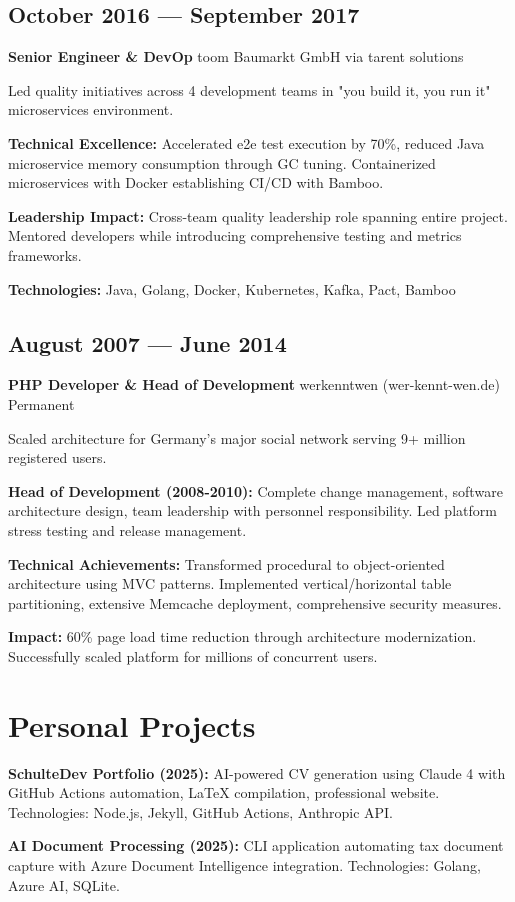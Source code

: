 \documentclass[10pt,a4paper]{article}
\newcommand{\role}[4]{\subsection{#1}\textbf{#2} \textbar{} #3 \textbar{} #4\vspace{2pt}}
\begin{document}
\role{October 2016 — September 2017}{Senior Engineer \& DevOp}{toom Baumarkt GmbH}{via tarent solutions}

Led quality initiatives across 4 development teams in "you build it, you run it" microservices environment.

\textbf{Technical Excellence:} Accelerated e2e test execution by 70\%, reduced Java microservice memory consumption through GC tuning. Containerized microservices with Docker establishing CI/CD with Bamboo.

\textbf{Leadership Impact:} Cross-team quality leadership role spanning entire project. Mentored developers while introducing comprehensive testing and metrics frameworks.

\textbf{Technologies:} Java, Golang, Docker, Kubernetes, Kafka, Pact, Bamboo

\vspace{4pt}

\role{August 2007 — June 2014}{PHP Developer \& Head of Development}{werkenntwen (wer-kennt-wen.de)}{Permanent}

Scaled architecture for Germany's major social network serving 9+ million registered users.

\textbf{Head of Development (2008-2010):} Complete change management, software architecture design, team leadership with personnel responsibility. Led platform stress testing and release management.

\textbf{Technical Achievements:} Transformed procedural to object-oriented architecture using MVC patterns. Implemented vertical/horizontal table partitioning, extensive Memcache deployment, comprehensive security measures.

\textbf{Impact:} 60\% page load time reduction through architecture modernization. Successfully scaled platform for millions of concurrent users.

\section{Personal Projects}

\textbf{SchulteDev Portfolio (2025):} AI-powered CV generation using Claude 4 with GitHub Actions automation, LaTeX compilation, professional website. Technologies: Node.js, Jekyll, GitHub Actions, Anthropic API.

\textbf{AI Document Processing (2025):} CLI application automating tax document capture with Azure Document Intelligence integration. Technologies: Golang, Azure AI, SQLite.
\end{document}
